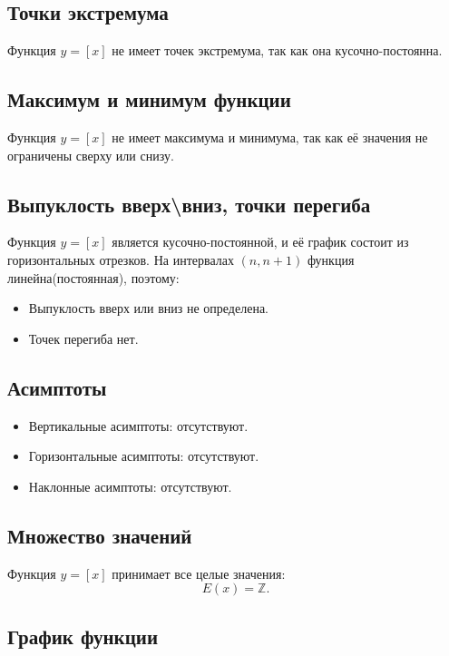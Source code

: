 \begin{flushleft}
		\subsection*{Точки экстремума}
		Функция $y=[x]$ не имеет точек экстремума, так как она кусочно-постоянна.
		
		\subsection*{Максимум и минимум функции}
		Функция $y=[x]$ не имеет максимума и минимума, так как её значения не ограничены сверху или снизу.
		
		\subsection*{Выпуклость вверх\textbackslash вниз, точки перегиба}
		Функция $y=[x]$ является кусочно-постоянной, и её график состоит из горизонтальных отрезков. На интервалах $(n,n+1)$ функция линейна(постоянная), поэтому:
		
		\begin{itemize}
			\item Выпуклость вверх или вниз не определена.
			\item Точек перегиба нет.
		\end{itemize}
		
		\subsection*{Асимптоты}
		
		\begin{itemize}
			\item Вертикальные асимптоты: отсутствуют.
			
			\item Горизонтальные асимптоты: отсутствуют.
			
			\item Наклонные асимптоты: отсутствуют.
		\end{itemize}
		
		\subsection*{Множество значений}
		Функция $y=[x]$ принимает все целые значения:
		\[E(x)=\mathds{Z}.\]
		 
		\subsection*{График функции}
		 

\end{flushleft}
